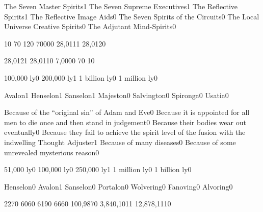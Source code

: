 {The Seven Master Spirits}{1}
{The Seven Supreme Executives}{1}
{The Reflective Spirits}{1}
{The Reflective Image Aids}{0}
{The Seven Spirits of the Circuits}{0}
{The Local Universe Creative Spirits}{0}
{The Adjutant Mind-Spirits}{0}
\qstop


{1}{0}
{7}{0}
{12}{0}
{7000}{0}
{28,011}{1}
{28,012}{0}
\qstop

{28,012}{1}
{28,011}{0}
{7,000}{0}
{7}{0}
{1}{0}
\qstop


{100,000 ly}{0}
{200,000 ly}{1}
{1 billion ly}{0}
{1 million ly}{0}
\qstop

{Avalon}{1}
{Henselon}{1}
{Sanselon}{1}
{Majeston}{0}
{Salvington}{0}
{Spironga}{0}
{Usatia}{0}
\qstop

{Because of the ``original sin'' of Adam and Eve}{0}
{Because it is appointed for all men to die once and then stand in judgement}{0}
{Because their bodies wear out eventually}{0}
{Because they fail to achieve the spirit level of the fusion with the indwelling Thought Adjuster}{1}
{Because of many diseases}{0}
{Because of some unrevealed mysterious reason}{0}
\qstop

{51,000 ly}{0}
{100,000 ly}{0}
{250,000 ly}{1}
{1 million ly}{0}
{1 billion ly}{0}
\qstop

{Henselon}{0}
{Avalon}{1}
{Sanselon}{0}
{Portalon}{0}
{Wolvering}{0}
{Fanoving}{0}
{Alvoring}{0}
\qstop

{227}{0}
{606}{0}
{619}{0}
{666}{0}
{100,987}{0}
{3,840,101}{1}
{12,878,111}{0}
\qstop


